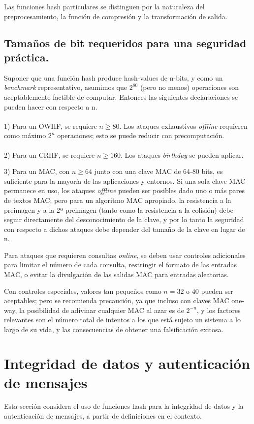 \documentclass[a4paper, 12pt]{article} %
\begin{document}
Las funciones hash particulares se distinguen por la naturaleza del preprocesamiento, la función de compresión y
la transformación de salida.

\subsection{Tamaños de bit requeridos para una seguridad práctica.}
Suponer que una función hash produce hash-values de n-bits, y como un \textit{benchmark} representativo, asumimos
que $2^{80}$ (pero no menos) operaciones son aceptablemente factible de computar. Entonces las siguientes
declaraciones se pueden hacer con respecto a n.\\ \\
1) Para un OWHF, se requiere $n \geq 80$. Los ataques exhaustivos \textit{offline} requieren como máximo $2^n$
operaciones; esto se puede reducir con precomputación.\\ \\
2) Para un CRHF, se requiere $n \geq 160$. Los ataques \textit{birthday} se pueden aplicar.

\newpage

3) Para un MAC, con $n \geq 64$ junto con una clave MAC de 64-80 bits, es suficiente para la mayoría
de las aplicaciones y entornos. Si una sola clave MAC permanece en uso, los ataques \textit{offline} pueden
ser posibles dado uno o más pares de textos MAC; pero para un algoritmo MAC apropiado, la resistencia a la preimagen
y a la 2ª-preimagen (tanto como la resistencia a la colisión) debe seguir directamente del desconocimiento de la
clave, y por lo tanto la seguridad con respecto a dichos ataques debe depender del tamaño de la clave en lugar de n.

Para ataques que requieren consultas \textit{online}, se deben usar controles adicionales para limitar el número
de cada consulta, restringir el formato de las entradas MAC, o evitar la divulgación de las salidas MAC para
entradas aleatorias.

Con controles especiales, valores tan pequeños como $n=32$ o $40$ pueden ser aceptables; pero
se recomienda precaución, ya que incluso con claves MAC one-way, la posibilidad de adivinar cualquier MAC al azar es
de $2^{-n}$, y los factores relevantes son el número total de intentos a los que está sujeto un sistema a lo
largo de su vida, y las consecuencias de obtener una falsificación exitosa.


\newpage
\section{Integridad de datos y autenticación de mensajes}
Esta sección considera el uso de funciones hash para la integridad de datos y la autenticación de mensajes,
a partir de definiciones en el contexto.
\end{document}
